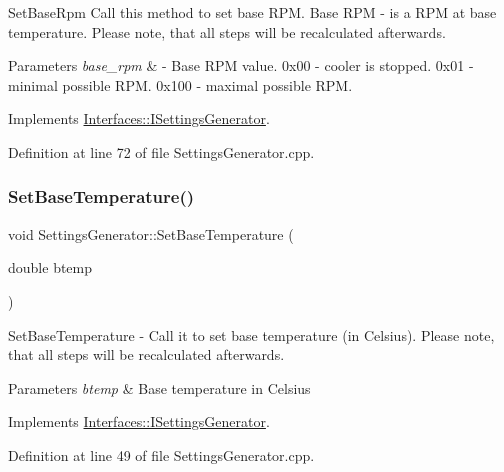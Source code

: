 Set\+Base\+Rpm Call this method to set base R\+PM. Base R\+PM -\/ is a R\+PM at base temperature. Please note, that all steps will be recalculated afterwards. 


\begin{DoxyParams}{Parameters}
{\em base\+\_\+rpm} & -\/ Base R\+PM value. 0x00 -\/ cooler is stopped. 0x01 -\/ minimal possible R\+PM. 0x100 -\/ maximal possible R\+PM. \\
\hline
\end{DoxyParams}


Implements \hyperlink{class_interfaces_1_1_i_settings_generator_a4caf07447d0930440d9f21318892244c}{Interfaces\+::\+I\+Settings\+Generator}.



Definition at line 72 of file Settings\+Generator.\+cpp.

\mbox{\label{class_settings_generator_aed9e7acb30bfd559b1ac70ceeddd8973}} 
\subsubsection{\texorpdfstring{Set\+Base\+Temperature()}{SetBaseTemperature()}}
{\footnotesize\ttfamily void Settings\+Generator\+::\+Set\+Base\+Temperature (\begin{DoxyParamCaption}\item[{double}]{btemp }\end{DoxyParamCaption})\hspace{0.3cm}{\ttfamily [virtual]}}



Set\+Base\+Temperature -\/ Call it to set base temperature (in Celsius). Please note, that all steps will be recalculated afterwards. 


\begin{DoxyParams}{Parameters}
{\em btemp} & Base temperature in Celsius \\
\hline
\end{DoxyParams}


Implements \hyperlink{class_interfaces_1_1_i_settings_generator_a8b60ba05790994db0303b251f655e95d}{Interfaces\+::\+I\+Settings\+Generator}.



Definition at line 49 of file Settings\+Generator.\+cpp.

